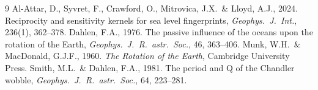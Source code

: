 \documentclass[11pt,a4paper]{article}
\begin{document}
\begin{thebibliography}{9}
 Al-Attar, D., Syvret, F., Crawford, O., Mitrovica, J.X.\ \& Lloyd, A.J., 2024. Reciprocity and sensitivity kernels for sea level fingerprints, \emph{Geophys.\ J.\ Int.}, 236(1), 362--378.
 Dahlen, F.A., 1976. The passive influence of the oceans upon the rotation of the Earth, \emph{Geophys.\ J.\ R.\ astr.\ Soc.}, 46, 363--406.
 Munk, W.H.\ \& MacDonald, G.J.F., 1960. \emph{The Rotation of the Earth}, Cambridge University Press.
 Smith, M.L.\ \& Dahlen, F.A., 1981. The period and Q of the Chandler wobble, \emph{Geophys.\ J.\ R.\ astr.\ Soc.}, 64, 223--281.
\end{thebibliography}
\end{document}
